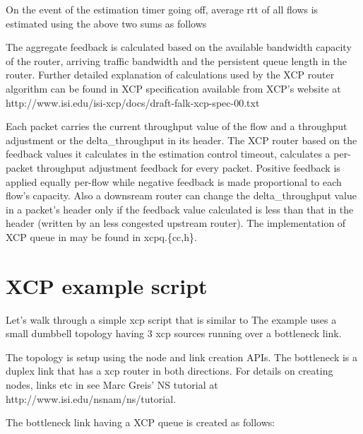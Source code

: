     On the event of the estimation timer going off, average rtt of all
    flows is estimated using the above two sums as follows

    
    The aggregate feedback is calculated based on the available bandwidth
    capacity of the router, arriving traffic bandwidth and the persistent
    queue length in the router. Further detailed explanation of
    calculations used by the XCP router algorithm can be found in XCP
    specification available from XCP's website at
    http://www.isi.edu/isi-xcp/docs/draft-falk-xcp-spec-00.txt 
    
    Each packet carries the current throughput value of the flow and a
    throughput adjustment or the delta\_throughput in its header. The XCP
    router based on the feedback values it calculates in the estimation
    control timeout, calculates a per-packet throughput adjustment
    feedback for every packet. Positive feedback is applied equally
    per-flow while negative feedback is made proportional to each flow's
    capacity. Also a downsream router can change the delta\_throughput
    value in a packet's header only if the feedback value calculated is
    less than that in the header (written by an less congested upstream
    router). The implementation of XCP queue in \ns{} may be found in
    xcpq.\{cc,h\}. 
    
  
    \section{XCP example script}
    \label{sec:example}
    
    Let's walk through a simple xcp script that is similar to
    The example uses a small dumbbell topology having 3 xcp sources
    running over a bottleneck link.
    
    The topology is setup using the node and link creation APIs. The bottleneck
    is a duplex link that has a xcp router in both directions. For
    details on creating nodes, links etc in \ns{} see Marc Greis' NS
    tutorial at http://www.isi.edu/nsnam/ns/tutorial.
  
    The bottleneck link having a XCP queue is created as follows:

